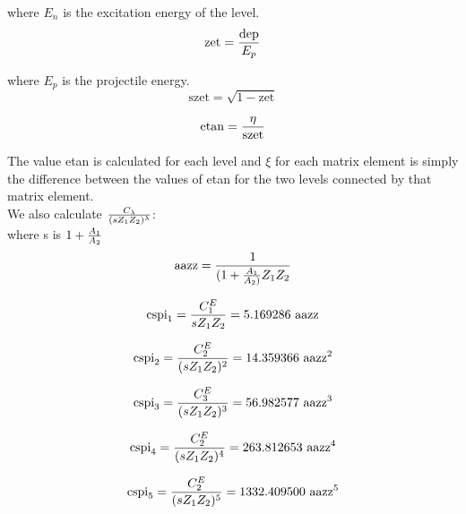 \noindent where $E_n$ is the excitation energy of the level.\\

\begin{equation}
\mathrm{zet} = {\mathrm{dep} \over E_p}
\end{equation}

\noindent where $E_p$ is the projectile energy.\\

\begin{equation}
\mathrm{szet} = \sqrt{1 - \mathrm{zet}}
\end{equation}

\begin{equation}
\mathrm{etan} = {\eta \over \mathrm{szet}}
\end{equation}

\noindent The value etan is calculated for each level and $\xi$ for each
matrix element is simply the difference between the values of etan for the
two levels connected by that matrix element.\\

\noindent We also calculate ${C_\lambda \over (s Z_1 Z_2)^\lambda}$:\\

\noindent where s is $1 + {A_1 \over A_2}$\\

\begin{equation}
\mathrm{aazz} = {1 \over {(1 + {A_1 \over A_2)}} Z_1 Z_2}
\end{equation}

\begin{equation}
\mathrm{cspi}_1 = {C_1^E \over s Z_1 Z_2} = 5.169286 ~\mathrm{aazz}
\end{equation}

\begin{equation}
\mathrm{cspi}_2 = {C_2^E \over (s Z_1 Z_2)^2} = 14.359366 ~\mathrm{aazz}^2
\end{equation}

\begin{equation}
\mathrm{cspi}_3 = {C_3^E \over (s Z_1 Z_2)^3} = 56.982577 ~\mathrm{aazz}^3
\end{equation}

\begin{equation}
\mathrm{cspi}_4 = {C_2^E \over (s Z_1 Z_2)^4} = 263.812653 ~\mathrm{aazz}^4
\end{equation}

\begin{equation}
\mathrm{cspi}_5 = {C_2^E \over (s Z_1 Z_2)^5} = 1332.409500 ~\mathrm{aazz}^5
\end{equation}


